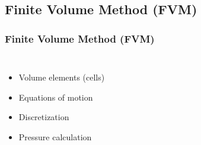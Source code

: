\subsection{Finite Volume Method (FVM)}


\begin{frame}
\frametitle{Finite Volume Method (FVM)}
\begin{columns}[c]

\begin{itemize}[<+(1)->]
\item Volume elements (cells)
\item Equations of motion
\item Discretization
\setcounter{nonstaggeredpauses}{\thebeamerpauses}
\setcounter{staggeredpauses}{\thebeamerpauses}
\item Pressure calculation
\end{itemize}



\end{columns}
\end{frame}
